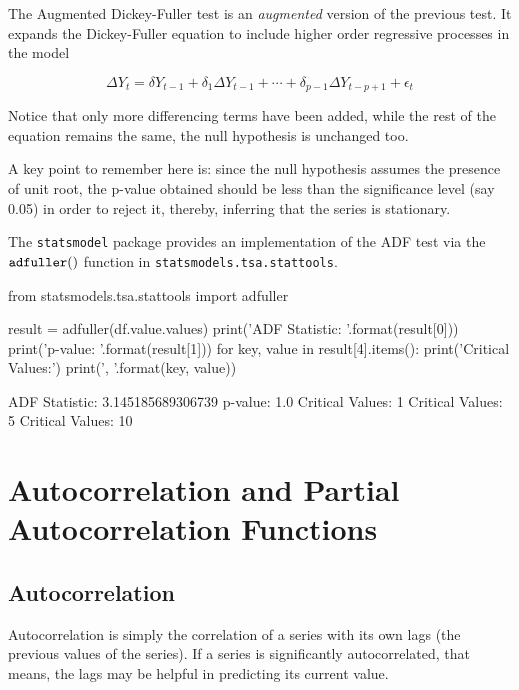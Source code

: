The Augmented Dickey-Fuller test is an \emph{augmented} version of the previous test. It expands the Dickey-Fuller equation
to include higher order regressive processes in the model

\[\Delta Y_t = \delta Y_{t-1} + \delta_1 \Delta Y_{t-1} + \cdots + \delta_{p-1} \Delta Y_{t-p+1} + \epsilon_t\]

Notice that only more differencing terms have been added, while the rest of the equation remains the same, the null hypothesis is unchanged too.

A key point to remember here is: since the null hypothesis assumes the presence of unit root, the p-value obtained should be less than the significance level (say 0.05) in order to reject it, thereby, inferring that the series is stationary.

The \texttt{statsmodel} package provides an implementation of the ADF test via the \(\tt{adfuller()}\) function in \texttt{statsmodels.tsa.stattools}.

\begin{ipython}
from statsmodels.tsa.stattools import adfuller

result = adfuller(df.value.values)
print('ADF Statistic: {}'.format(result[0]))
print('p-value: {}'.format(result[1]))
for key, value in result[4].items():
    print('Critical Values:')
    print('{}, {}'.format(key, value))
\end{ipython}
\begin{ioutput}
ADF Statistic: 3.145185689306739
p-value: 1.0
Critical Values:
   1%
Critical Values:
   5%
Critical Values:
   10%
\end{ioutput}

\section{Autocorrelation and Partial Autocorrelation Functions}
\label{autocorrelation-and-partial-autocorrelation-functions}

\subsection{Autocorrelation}\label{autocorrelation}

Autocorrelation is simply the correlation of a series with its own lags (the previous values of the series). If a series is significantly autocorrelated, that means, the lags may be helpful in predicting its current value.

